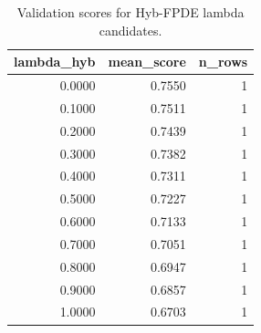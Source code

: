 \begin{table}[t]
\caption{Validation scores for Hyb-FPDE lambda candidates.}
\label{tab:lambda_distribution_computed}
\centering
\begin{tabular}{rrr}
\toprule
lambda\_hyb & mean\_score & n\_rows \\
\midrule
0.0000 & 0.7550 & 1 \\
0.1000 & 0.7511 & 1 \\
0.2000 & 0.7439 & 1 \\
0.3000 & 0.7382 & 1 \\
0.4000 & 0.7311 & 1 \\
0.5000 & 0.7227 & 1 \\
0.6000 & 0.7133 & 1 \\
0.7000 & 0.7051 & 1 \\
0.8000 & 0.6947 & 1 \\
0.9000 & 0.6857 & 1 \\
1.0000 & 0.6703 & 1 \\
\bottomrule
\end{tabular}

\end{table}
